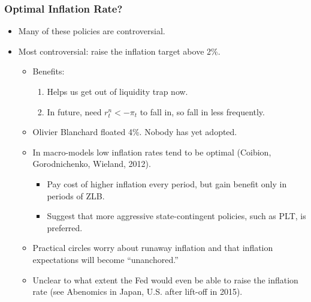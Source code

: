 \documentclass[english,xcolor=svgnames]{beamer}
\begin{document}
\begin{frame}
\frametitle{Optimal Inflation Rate?}

\begin{itemize}
\item Many of these policies are controversial.
\item Most controversial: raise the inflation target above 2\%.
	\begin{itemize}
		\item Benefits:
		\begin{enumerate}[1.]
			\item Helps us get out of liquidity trap now.
			\item In future, need $r_{t}^n < -\pi_t$ to fall in, so fall in less frequently.
		\end{enumerate}
	\item Olivier Blanchard floated 4\%. Nobody has yet adopted.	
	\item In macro-models low inflation rates tend to be optimal (Coibion, Gorodnichenko, Wieland, 2012).
	\begin{itemize}
		\item Pay cost of higher inflation every period, but gain benefit only in periods of ZLB.
		\item Suggest that more aggressive state-contingent policies, such as PLT, is preferred.
	\end{itemize}
	\item Practical circles worry about runaway inflation and that inflation expectations will become ``unanchored.''
	\item Unclear to what extent the Fed would even be able to raise the inflation rate (see Abenomics in Japan, U.S. after lift-off in 2015).
\end{itemize}
\end{itemize}	
\end{frame}
\end{document}

